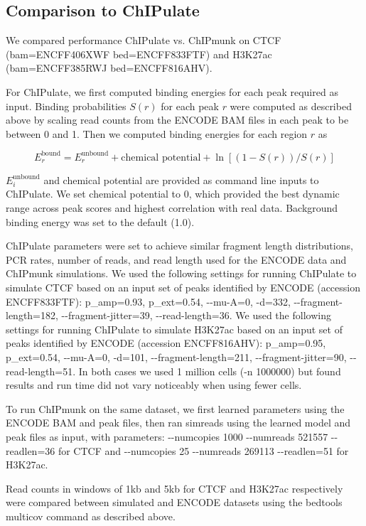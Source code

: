 \documentclass[12pt]{article}
\begin{document}
\subsection*{Comparison to ChIPulate}

We compared performance ChIPulate \cite{chipulate} vs. ChIPmunk on CTCF (bam=ENCFF406XWF bed=ENCFF833FTF) and H3K27ac (bam=ENCFF385RWJ bed=ENCFF816AHV).

For ChIPulate, we first computed binding energies for each peak required as input. Binding probabilities $S(r)$ for each peak $r$ were computed as described above by scaling read counts from the ENCODE BAM files in each peak to be between 0 and 1. Then we computed binding energies for each region $r$ as

$$E^{\text{bound}}_r= E^{\text{unbound}}_r + \text{chemical potential} + \ln\left[(1-S(r))/S(r)\right]$$

$E^{\text{unbound}}_i$ and chemical potential are provided as command line inputs to ChIPulate. We set chemical potential to 0, which provided the best dynamic range across peak scores and highest correlation with real data. Background binding energy was set to the default (1.0).

ChIPulate parameters were set to achieve similar fragment length distributions, PCR rates, number of reads, and read length used for the ENCODE data and ChIPmunk simulations. We used the following settings for running ChIPulate to simulate CTCF based on an input set of peaks identified by ENCODE (accession ENCFF833FTF): p\_amp=0.93, p\_ext=0.54, -{}-mu-A=0, -d=332, -{}-fragment-length=182, -{}-fragment-jitter=39, -{}-read-length=36. We used the following settings for running ChIPulate to simulate H3K27ac based on an input set of peaks identified by ENCODE (accession ENCFF816AHV): p\_amp=0.95, p\_ext=0.54, -{}-mu-A=0, -d=101, -{}-fragment-length=211, -{}-fragment-jitter=90, -{}-read-length=51.
In both cases we used 1 million cells (-n 1000000) but found results and run time did not vary noticeably when using fewer cells.

To run ChIPmunk on the same dataset, we first learned parameters using the ENCODE BAM and peak files, then ran simreads using the learned model and peak files as input, with parameters: -{}-numcopies 1000 -{}-numreads 521557 -{}-readlen=36 for CTCF and -{}-numcopies 25 -{}-numreads 269113 -{}-readlen=51 for H3K27ac.

Read counts in windows of 1kb and 5kb for CTCF and H3K27ac respectively were compared between simulated and ENCODE datasets using the bedtools multicov command as described above.
\end{document}
